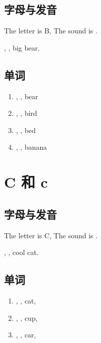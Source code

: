 \subsection{字母与发音}

The letter is B, The sound is .

, , big bear.


\subsection{单词}

\begin{enumerate}
  \item {}, , bear
  \item {}, , bird
  \item {}, , bed
  \item {}, , banana
\end{enumerate}




\section{C 和 c}

\subsection{字母与发音}

The letter is C, The sound is .

, , cool cat.

\subsection{单词}

\begin{enumerate}
  \item {}, , cat, 
  \item {}, , cup, 
  \item {}, , car, 
\end{enumerate}




